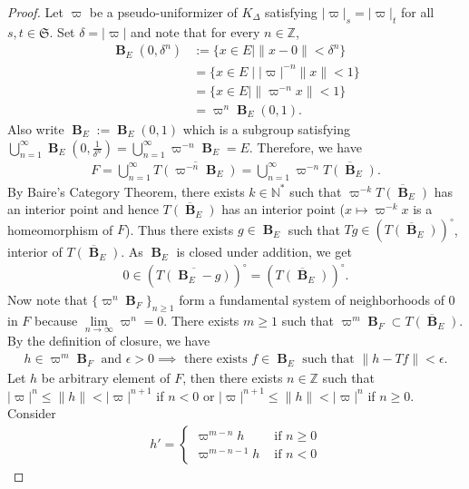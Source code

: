 \documentclass[10pt,a4paper]{amsart}
\DeclareMathOperator{\B}{\textbf{B}}
\begin{document}
\begin{proof}
	Let $\varpi$ be a pseudo-uniformizer of $K_\Delta$ satisfying $|\varpi|_s=|\varpi|_t$ for all $s,t\in\mathfrak{S}$.  Set $\delta=|\varpi|$ and note that for every $n\in\mathbb{Z}$,
	\begin{align*}
		\B_E(0,\delta^n)&:=\{x\in E\mid \|x-0\|<\delta^n\}\\
		                        &=\{x\in E\mid |\varpi|^{-n}\|x\|<1\}\\
		                        &=\{x\in E\mid \|\varpi^{-n}x\|<1\}\\
		                        &=\varpi^n\B_E(0,1).
	\end{align*}
	Also write $\B_E:=\B_E(0,1)$ which is a subgroup satisfying $\bigcup\limits_{n=1}^\infty\B_E\left(0,\frac{1}{\delta^n}\right)=\bigcup\limits_{n=1}^\infty\varpi^{-n}\B_E=E$. Therefore, we have
	\begin{align*}
		F=\bigcup\limits_{n=1}^\infty \overline{T(\varpi^{-n}\B_E)}=\bigcup\limits_{n=1}^\infty \varpi^{-n}\overline{T(\B_E)}.
	\end{align*}
	By Baire's Category Theorem, there exists $k\in\mathbb{N}^*$ such that $\varpi^{-k}\overline{T(\B_E)}$ has an interior point and hence $\overline{T(\B_E)}$ has an interior point ($x\mapsto \varpi^{-k}x$ is a homeomorphism of $F$). Thus there exists $g\in\B_E$ such that $Tg\in\left(\overline{T(\B_E)}\right)^\circ$, interior of $\overline{T(\B_E)}$. As $\B_E$ is closed under addition, we get
	\begin{align*}
		0\in\left(\overline{T(\B_E-g)}\right)^\circ=\left(\overline{T(\B_E)}\right)^\circ.
	\end{align*}
	Now note that $\{\varpi^n\B_F\}_{n\geq 1}$ form a fundamental system of neighborhoods of $0$ in $F$ because $\lim\limits_{n\to\infty}\varpi^n=0$. There exists $m\geq 1$ such that $\varpi^m\B_F\subset \overline{T(\B_E)}$. By the definition of closure, we have
	\begin{align*}
		h\in\varpi^m\B_F\text{ and }\epsilon>0\implies \text{ there exists } f\in\B_E\text{ such that }\|h-Tf\|<\epsilon.
	\end{align*}
	Let $h$ be arbitrary element of $F$, then there exists $n\in\mathbb{Z}$ such that $|\varpi|^n\leq \|h\|<|\varpi|^{n+1}$ if $n<0$ or $|\varpi|^{n+1}\leq\|h\|<|\varpi|^n$ if $n\geq 0$. Consider
	\begin{align*}
		h'=
		\begin{cases}
			\varpi^{m-n}h &\text{ if } n\geq 0\\
			\varpi^{m-n-1}h &\text{ if } n<0

\end{cases}
\end{align*}
\end{proof}
\end{document}
